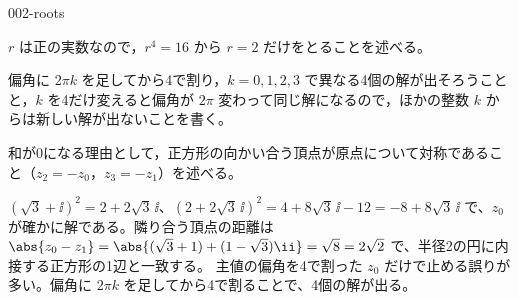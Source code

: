 \documentclass[uplatex,dvipdfmx,a4paper,11pt]{jsarticle}
\begin{document}
\begin{kaisetsu}{002-roots}
\begin{ronten}
  \item {} $r$ は正の実数なので，$r^{4}=16$ から $r=2$ だけをとることを述べる。
  \item {} 偏角に $2\pi k$ を足してから4で割り，$k=0,1,2,3$ で異なる4個の解が出そろうことと，$k$ を4だけ変えると偏角が $2\pi$ 変わって同じ解になるので，ほかの整数 $k$ からは新しい解が出ないことを書く。
  \item {} 和が0になる理由として，正方形の向かい合う頂点が原点について対称であること（$z_{2}=-z_{0}$，$z_{3}=-z_{1}$）を述べる。
\end{ronten}
\kenzan $(\sqrt{3}+\ii)^{2}=2+2\sqrt{3}\,\ii$、$(2+2\sqrt{3}\,\ii)^{2}=4+8\sqrt{3}\,\ii-12=-8+8\sqrt{3}\,\ii$ で、$z_{0}$ が確かに解である。隣り合う頂点の距離は $\abs{z_{0}-z_{1}}=\abs{(\sqrt{3}+1)+(1-\sqrt{3})\ii}=\sqrt{8}=2\sqrt{2}$ で、半径2の円に内接する正方形の1辺と一致する。
\tsumazuki 主値の偏角を4で割った $z_{0}$ だけで止める誤りが多い。偏角に $2\pi k$ を足してから4で割ることで、4個の解が出る。
\end{kaisetsu}
\end{document}
